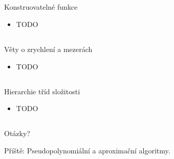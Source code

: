 \documentclass{beamer}
\begin{document}
\subsection{}
\begin{frame}{Konstruovatelné funkce}
\begin{itemize}
\item TODO
\end{itemize}
\end{frame}

\subsection{}
\begin{frame}{Věty o zrychlení a mezerách}
\begin{itemize}
\item TODO
\end{itemize}
\end{frame}

\subsection{}
\begin{frame}{Hierarchie tříd složitosti}
\begin{itemize}
\item TODO
\end{itemize}
\end{frame}

\subsection{}
\begin{frame}{Otázky?}
\begin{center}
Příště: Pseudopolynomiální a aproximační algoritmy.
\end{center}
\end{frame}

\subsection{}
\end{document}
